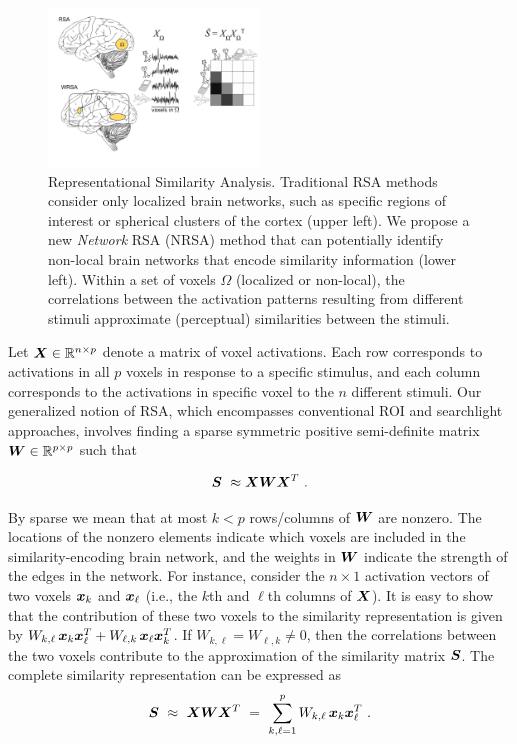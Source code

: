 \begin{figure}[!h]
	\centering
    \includegraphics[width=0.5\textwidth]{figures/WRSA.pdf}
  \caption{Representational Similarity Analysis. Traditional RSA methods consider only
    localized brain networks, such as specific regions of interest or spherical clusters
    of the cortex (upper left). We propose a new {\em Network} RSA
    (NRSA) method that can potentially identify non-local brain networks that encode
    similarity information (lower left). Within a set of voxels $\Omega$ (localized or
    non-local), the correlations between the activation patterns resulting from different
    stimuli approximate (perceptual) similarities between the stimuli. \label{fig.fitting}}
\end{figure}

Let $\boldsymbol{X} \in {\mathbb R}^{n\times p}$ denote a matrix of voxel activations.
Each row corresponds to activations in all $p$ voxels in response to a specific stimulus,
and each column corresponds to the activations in specific voxel to the $n$ different
stimuli. Our generalized notion of RSA, which encompasses conventional ROI \citep{RSA} and
searchlight \citep{searchlight} approaches, involves finding a sparse symmetric positive
semi-definite matrix $\boldsymbol{W}\in {\mathbb R}^{p\times p}$ such that

$$\bS \ \approx \bX \bW \bX^T \ .$$

By sparse we mean that at most $k<p$ rows/columns of $\boldsymbol{W}$ are nonzero. The locations of
the nonzero elements indicate which voxels are included in the similarity-encoding brain
network, and the weights in $\boldsymbol{W}$ indicate the strength of the edges in the network. For
instance, consider the $n\times 1$ activation vectors of two voxels $\boldsymbol{x}_k$ and
$\boldsymbol{x}_{\ell}$ (i.e., the $k$th and $\ell$th columns of $\boldsymbol{X}$). It is easy to show that the
contribution of these two voxels to the similarity representation is given by $ W_{k,\ell}
\, \boldsymbol{x}_k \boldsymbol{x}_{\ell}^T + W_{\ell,k} \, \boldsymbol{x}_\ell \boldsymbol{x}_{k}^T$. If $W_{k,\ell}=W_{\ell,k}\neq
0$, then the correlations between the two voxels contribute to the approximation of the
similarity matrix $\boldsymbol{S}$. The complete similarity representation can be expressed as
$$\bS \ \approx \ \bX\bW\bX^T \ = \ \sum_{k,\ell=1}^p W_{k,\ell} \, \bx_k \bx_{\ell}^T \ .$$

